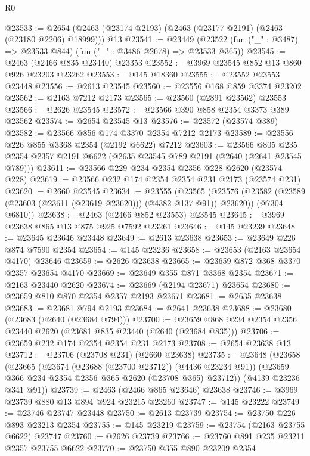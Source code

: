 \begin{lexlean}{R0}
\begin{coremodule}
@23533 := @2654 (@2463 (@23174 @2193) (@2463 (@23177 @2191) (@2463 (@23180 @2206) @18999))) @13
@23541 := @23449
    (@23522 (fun ("_" : @3487) => @23533 @844) (fun ("_" : @3486 @2678) => @23533 @365))
@23545 := @2463 (@2466 @835 @23440) @23353
@23552 := @3969 @23545 @852 @13 @860 @926 @23203 @23262
@23553 := @145 @18360
@23555 := @23552 @23553 @23448
@23556 := @2613 @23545
@23560 := @23556 @168 @859 @3374 @23202
@23562 := @2163 @7212 @2173
@23565 := @23560 (@2891 @23562) @23553
@23566 := @2626 @23545
@23572 := @23566 @390 @858 @2354 @3373 @389 @23562
@23574 := @2654 @23545 @13
@23576 := @23572 (@23574 @389)
@23582 := @23566 @856 @174 @3370 @2354 @7212 @2173
@23589 := @23556 @226 @855 @3368 @2354 (@2192 @6622) @7212
@23603 := @23566
    @805
    @235
    @2354
    @2357
    @2191
    @6622
    (@2635 @23545 @789 @2191 (@2640 (@2641 @23545 @789)))
@23611 := @23566 @229 @234 @2354 @2356 @228 @2620 (@23574 @228)
@23619 := @23566 @232 @174 @2354 @2354 @231 @2173 (@23574 @231)
@23620 := @2660 @23545
@23634 := @23555
    (@23565
      (@23576 (@23582 (@23589 (@23603 (@23611 (@23619 @23620))) (@4382 @137 @91)) @23620))
      (@7304 @6810))
@23638 := @2463 (@2466 @852 @23553) @23545
@23645 := @3969 @23638 @865 @13 @875 @925 @7592 @23261
@23646 := @145 @23239
@23648 := @23645 @23646 @23448
@23649 := @2613 @23638
@23653 := @23649 @226 @874 @7590 @2354
@23654 := @145 @23236
@23658 := @23653 (@2163 @23654 @4170) @23646
@23659 := @2626 @23638
@23665 := @23659 @872 @368 @3370 @2357 @23654 @4170
@23669 := @23649 @355 @871 @3368 @2354
@23671 := @2163 @23440 @2620
@23674 := @23669 (@2194 @23671) @23654
@23680 := @23659 @810 @870 @2354 @2357 @2193 @23671
@23681 := @2635 @23638
@23683 := @23681 @794 @2193
@23684 := @2641 @23638
@23688 := @23680 (@23683 (@2640 (@23684 @794)))
@23700 := @23659 @868 @234 @2354 @2356 @23440 @2620 (@23681 @835 @23440 (@2640 (@23684 @835)))
@23706 := @23659 @232 @174 @2354 @2354 @231 @2173
@23708 := @2654 @23638 @13
@23712 := @23706 (@23708 @231) (@2660 @23638)
@23735 := @23648
    (@23658
      (@23665
        (@23674 (@23688 (@23700 @23712)) (@4436 @23234 @91))
        (@23659 @366 @234 @2354 @2356 @365 @2620 (@23708 @365) @23712))
      (@4139 @23236 @341 @91))
@23739 := @2463 (@2466 @865 @23646) @23638
@23746 := @3969 @23739 @880 @13 @894 @924 @23215 @23260
@23747 := @145 @23222
@23749 := @23746 @23747 @23448
@23750 := @2613 @23739
@23754 := @23750 @226 @893 @23213 @2354
@23755 := @145 @23219
@23759 := @23754 (@2163 @23755 @6622) @23747
@23760 := @2626 @23739
@23766 := @23760 @891 @235 @23211 @2357 @23755 @6622
@23770 := @23750 @355 @890 @23209 @2354

\end{coremodule}
\end{lexlean}
